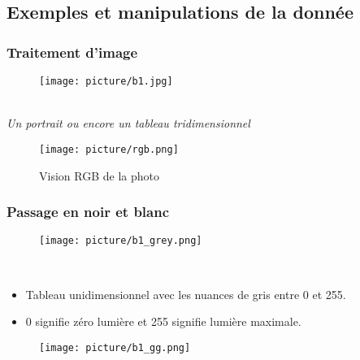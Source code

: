 \documentclass{beamer}
\theoremstyle{definition}
\begin{document}
\subsection{Exemples et manipulations de la donnée}
\begin{frame}
	\frametitle{Traitement d'image}
	\begin{minipage}[c]{1\linewidth}
		\centering
		
			\begin{minipage}[t]{0.25\linewidth}
			\centering
			\begin{figure}
				\centering
				\texttt{[image: picture/b1.jpg]}
			\end{figure}			
		\end{minipage}\hfill\\[0.25cm]
	\emph{Un portrait ou encore un tableau tridimensionnel}	\hfill\\[-0.15cm]
			\begin{minipage}[t]{1\linewidth}
			\centering
			\begin{figure}
				\centering
				\texttt{[image: picture/rgb.png]}
				\caption*{Vision RGB de la photo}					
			\end{figure}			
		\end{minipage}
	\end{minipage}

\end{frame}

\begin{frame}
	\frametitle{Passage en noir et blanc}
	\begin{minipage}[t]{1\linewidth}
		\centering
		
		\begin{minipage}[t]{0.45\linewidth}
			\centering
			\begin{figure}
				\centering
				\texttt{[image: picture/b1\_grey.png]}
			\end{figure}\hfil\\[-0.25cm]
		\begin{itemize}
			\item Tableau unidimensionnel avec les nuances de gris entre 0 et 255.
			\item 0 signifie zéro lumière et 255 signifie lumière maximale.
		\end{itemize}
		
			
		\end{minipage}\hfill\begin{minipage}[t]{0.45\linewidth}
			\centering
			\begin{figure}
				\centering
				\texttt{[image: picture/b1\_gg.png]}
			\end{figure}			
		\end{minipage}
	\end{minipage}
	
\end{frame}
\end{document}
